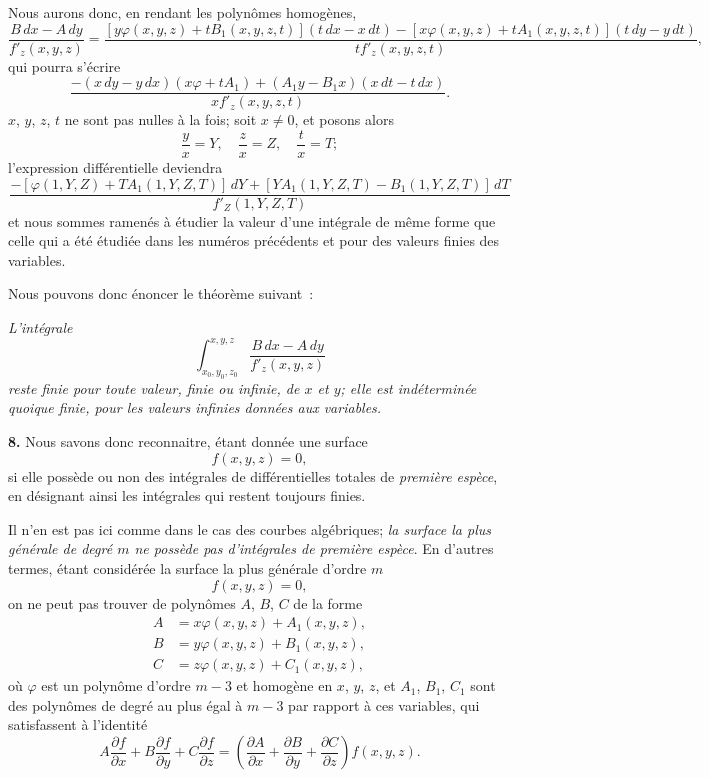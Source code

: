 \documentclass{article}
\begin{document}
Nous aurons donc, en rendant les polynômes homogènes,
\[
\frac{B\,dx - A\,dy}{f'_{z}(x, y, z)} = \frac{[y\varphi(x, y, z) + tB_{1}(x, y, z, t)](t\,dx - x\,dt) - [x\varphi(x, y, z) + tA_{1}(x, y, z, t)](t\,dy - y\,dt)}{tf'_{z}(x, y, z, t)},
\]
qui pourra s'écrire
\[
\frac{-(x\,dy - y\,dx)(x\varphi + tA_{1}) + (A_{1}y - B_{1}x)(x\,dt - t\,dx)}{xf'_{z}(x, y, z, t)}.
\]
$x$, $y$, $z$, $t$ ne sont pas nulles à la fois; soit $x \neq 0$, et posons alors
\[
\frac{y}{x} = Y, \quad \frac{z}{x} = Z, \quad \frac{t}{x} = T;
\]
l'expression différentielle deviendra
\[
\frac{-[\varphi(1, Y, Z) + TA_{1}(1, Y, Z, T)]\,dY + [YA_{1}(1, Y, Z, T) - B_{1}(1, Y, Z, T)]\,dT}{f'_{Z}(1, Y, Z, T)}
\]
et nous sommes ramenés à étudier la valeur d'une intégrale de même forme que celle qui a été étudiée dans les numéros précédents et pour des valeurs finies des variables.

Nous pouvons donc énoncer le théorème suivant~:

\emph{L'intégrale}
\[
\int_{x_{0}, y_{0}, z_{0}}^{x, y, z} \frac{B\,dx - A\,dy}{f'_{z}(x, y, z)}
\]
\emph{reste finie pour toute valeur, finie ou infinie, de $x$ et $y$; elle est indéterminée quoique finie, pour les valeurs infinies données aux variables.}

\textbf{8.} Nous savons donc reconnaitre, étant donnée une surface
\[
f(x, y, z) = 0,
\]
si elle possède ou non des intégrales de différentielles totales de \emph{première espèce}, en désignant ainsi les intégrales qui restent toujours finies.

Il n'en est pas ici comme dans le cas des courbes algébriques; \emph{la surface la plus générale de degré $m$ ne possède pas d'intégrales de première espèce}. En d'autres termes, étant considérée la surface la plus générale d'ordre $m$
\[
f(x, y, z) = 0,
\]
on ne peut pas trouver de polynômes $A$, $B$, $C$ de la forme
\[
\begin{aligned}
A &= x\varphi(x, y, z) + A_{1}(x, y, z), \\
B &= y\varphi(x, y, z) + B_{1}(x, y, z), \\
C &= z\varphi(x, y, z) + C_{1}(x, y, z),
\end{aligned}
\]
où $\varphi$ est un polynôme d'ordre $m - 3$ et homogène en $x$, $y$, $z$, et $A_{1}$, $B_{1}$, $C_{1}$ sont des polynômes de degré au plus égal à $m - 3$ par rapport à ces variables, qui satisfassent à l'identité
\[
A \frac{\partial f}{\partial x} + B \frac{\partial f}{\partial y} + C \frac{\partial f}{\partial z} = \left( \frac{\partial A}{\partial x} + \frac{\partial B}{\partial y} + \frac{\partial C}{\partial z} \right) f(x, y, z).
\]
\end{document}
